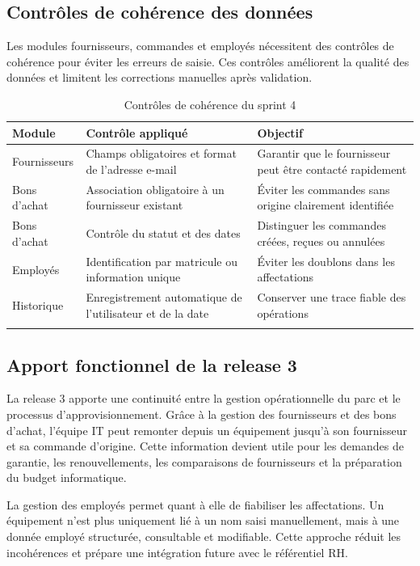 \subsection{Contrôles de cohérence des données}

Les modules fournisseurs, commandes et employés nécessitent des contrôles de cohérence pour éviter les erreurs de saisie. Ces contrôles améliorent la qualité des données et limitent les corrections manuelles après validation.

\begin{longtable}{|m{4cm}|m{5cm}|m{5cm}|}
\hline
\textbf{Module} & \textbf{Contrôle appliqué} & \textbf{Objectif} \\
\hline
\endhead
\endfoot
\endlastfoot
\hline
Fournisseurs & Champs obligatoires et format de l'adresse e-mail & Garantir que le fournisseur peut être contacté rapidement \\
\hline
Bons d'achat & Association obligatoire à un fournisseur existant & Éviter les commandes sans origine clairement identifiée \\
\hline
Bons d'achat & Contrôle du statut et des dates & Distinguer les commandes créées, reçues ou annulées \\
\hline
Employés & Identification par matricule ou information unique & Éviter les doublons dans les affectations \\
\hline
Historique & Enregistrement automatique de l'utilisateur et de la date & Conserver une trace fiable des opérations \\
\hline
\captionsetup{justification=centering,margin=1cm}
\caption{Contrôles de cohérence du sprint 4}
\end{longtable}

\subsection{Apport fonctionnel de la release 3}

La release 3 apporte une continuité entre la gestion opérationnelle du parc et le processus d'approvisionnement. Grâce à la gestion des fournisseurs et des bons d'achat, l'équipe IT peut remonter depuis un équipement jusqu'à son fournisseur et sa commande d'origine. Cette information devient utile pour les demandes de garantie, les renouvellements, les comparaisons de fournisseurs et la préparation du budget informatique.

La gestion des employés permet quant à elle de fiabiliser les affectations. Un équipement n'est plus uniquement lié à un nom saisi manuellement, mais à une donnée employé structurée, consultable et modifiable. Cette approche réduit les incohérences et prépare une intégration future avec le référentiel RH.

